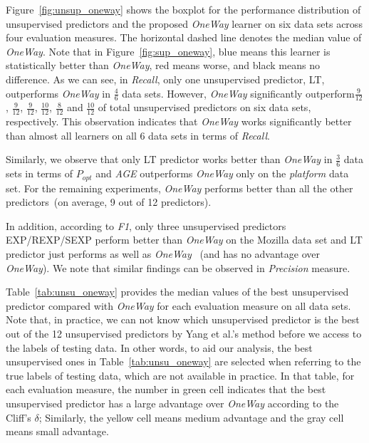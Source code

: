 \documentclass[sigconf]{acmart}
\theoremstyle{break}
\newcommand{\fig}[1]{Figure~\ref{fig:#1}}
\newcommand{\tab}[1]{Table~\ref{tab:#1}}
\begin{document}
\fig{unsup_oneway} shows the boxplot for the performance distribution of
unsupervised predictors and the proposed
{\it OneWay} learner on six data sets across four evaluation measures. The horizontal 
dashed line denotes the median value of {\it OneWay}. Note that in \fig{sup_oneway}, blue 
means this learner is statistically better than {\it OneWay}, red means worse, 
and black means no difference. As we can see, in   {\it Recall},
only one unsupervised predictor, LT, outperforms {\it OneWay} in $\frac{4}{6}$ data sets. However, {\it OneWay}
significantly outperform$\frac{9}{12}$, $\frac{9}{12}$, $\frac{9}{12}$, $\frac{10}{12}$,
 $\frac{8}{12}$ and $\frac{10}{12}$ of total unsupervised predictors on six data sets, respectively.
 This observation indicates that {\it OneWay} works significantly better 
 than almost all learners on all 6 data sets in terms of {\it Recall}.
 
 Similarly, we observe that only LT predictor works better than {\it OneWay} in
$\frac{3}{6}$ data sets in terms of {\it $P_{opt}$} and {\it AGE} outperforms {\it OneWay} only on the {\it platform} data set.
For the remaining experiments, {\it OneWay} performs better than all the other predictors~(on average, 9 out of 12 predictors). 

In addition, according to {\it F1}, only three unsupervised predictors EXP/REXP/SEXP 
perform better than {\it OneWay} on the Mozilla data set and
LT predictor just performs as well as {\it OneWay} 
~(and has no  advantage over {\it OneWay}). We note that similar findings can be observed in {\it Precision} measure.

\tab{unsu_oneway} provides the median values of the best unsupervised predictor compared with {\it OneWay}
for each evaluation measure on all data sets. Note that, in practice, we can not know which unsupervised predictor is the best out of the 12 unsupervised predictors by Yang et al.'s method before we access to the labels of testing data. In other words, to aid our analysis, the best unsupervised ones  in \tab{unsu_oneway} are selected when referring to the true labels of testing data, which are not available in practice. In that table, for each evaluation measure,
the number in {green} cell indicates that the best unsupervised predictor has a large advantage
over {\it OneWay} according to the Cliff's $\delta$; Similarly, the {yellow} cell means medium advantage
and the {gray} cell means small advantage. 
\end{document}
